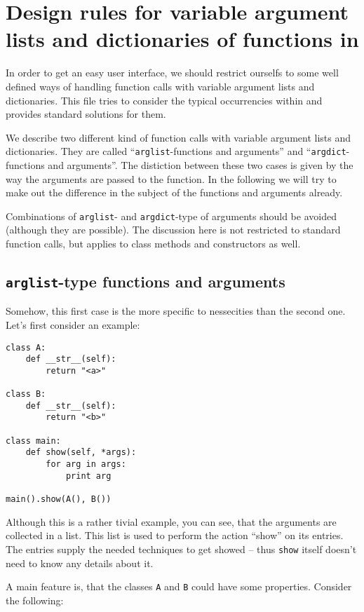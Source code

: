 \documentclass{article}
\begin{document}
\section*{Design rules for variable argument lists and dictionaries
of functions in \PyX}

In order to get an easy user interface, we should restrict ourselfs to
some well defined ways of handling function calls with variable
argument lists and dictionaries. This file tries to consider the
typical occurrencies within \PyX{} and provides standard solutions for
them.

We describe two different kind of function calls with variable
argument lists and dictionaries. They are called
``\verb|arglist|-functions and arguments'' and
``\verb|argdict|-functions and arguments''. The distiction between
these two cases is given by the way the arguments are passed to the
function. In the following we will try to make out the difference in
the subject of the functions and arguments already.

Combinations of \verb|arglist|- and \verb|argdict|-type of arguments
should be avoided (although they are possible). The discussion here is
not restricted to standard function calls, but applies to class
methods and constructors as well.

\subsection*{\texttt{arglist}-type functions and arguments}

Somehow, this first case is the more specific to \PyX{} nessecities than
the second one. Let's first consider an example:

\begin{verbatim}
class A:
    def __str__(self):
        return "<a>"

class B:
    def __str__(self):
        return "<b>"

class main:
    def show(self, *args):
        for arg in args:
            print arg

main().show(A(), B())
\end{verbatim}

Although this is a rather tivial example, you can see, that the
arguments are collected in a list. This list is used to perform the
action ``show'' on its entries. The entries supply the needed
techniques to get showed -- thus \verb|show| itself doesn't need to
know any details about it.

A main feature is, that the classes \verb|A| and \verb|B| could have
some properties. Consider the following:
\end{document}
